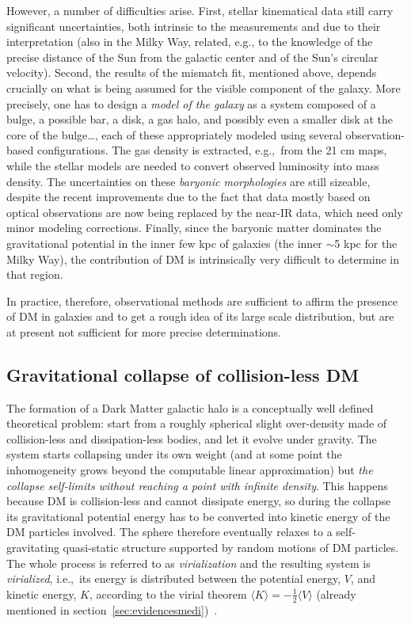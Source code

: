 \smallskip

However, a number of difficulties arise. First, stellar kinematical data still carry significant uncertainties, both intrinsic to the measurements and due to their interpretation (also in the Milky Way, related, e.g., to the knowledge of the precise distance of the Sun from the galactic center and of the Sun's circular velocity). 
Second, the results of the mismatch fit, mentioned above, depends crucially on what is being assumed for the visible component of the galaxy.   More precisely, one has to design a {\it  model of the galaxy} as a system composed of a bulge, a possible bar, a disk, a gas halo, and possibly even a smaller disk at the core of the bulge\ldots, each of these appropriately modeled using several observation-based configurations. 
The gas density is extracted, e.g.,~from the 21 cm maps, while the stellar models are needed to convert observed luminosity into mass density.
The uncertainties on these {\em baryonic morphologies} are still sizeable, despite the recent improvements due to the fact that data mostly based on optical observations are now being replaced by the near-IR data, which need only minor modeling corrections.
Finally, since the baryonic matter dominates the gravitational potential in the inner few kpc of galaxies (the inner $\sim$5 kpc for the Milky Way), the contribution of DM is intrinsically very difficult to determine in that region. 

\medskip

In practice, therefore, observational methods are sufficient to affirm the presence of DM in galaxies and to get a rough idea of its large scale distribution, but are at present not sufficient for more precise determinations. 




\subsection{Gravitational collapse of collision-less DM} 
\label{sec:rho_from_analytic}
The formation of a Dark Matter galactic halo is a conceptually well defined theoretical problem: 
start from a roughly spherical slight over-density made of collision-less and dissipation-less bodies, and let it evolve under gravity. 
The system starts collapsing under its own weight (and at some point the inhomogeneity grows beyond the computable linear approximation) but {\em the collapse self-limits without reaching a point with infinite density}.
This happens because DM is collision-less and cannot dissipate energy, so during the collapse its gravitational potential energy has to be converted into kinetic energy of the DM particles involved. 
The sphere therefore eventually relaxes to a self-gravitating quasi-static structure supported by random motions of DM particles. 
The whole process is referred to as {\em virialization} and the resulting system is {\em virialized}, i.e.,~its energy is distributed between the potential energy, $V$, and kinetic energy, $K$, according to the virial theorem $\langle K\rangle = -\frac{1}{2}\langle{V}\rangle$ (already mentioned in section~\ref{sec:evidencesmedi})~\cite{books_galaxy_formation}. 

